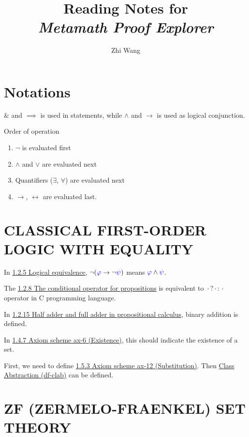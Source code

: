 \documentclass[12pt, letterpaper]{article}
\title{Reading Notes for \\ \large \textit{Metamath Proof Explorer}}
\author{Zhi Wang}
\newcommand{\blue}[1]{{\color{blue} #1}}
\newcommand{\ra}{\rightarrow}
\newcommand{\lra}{\leftrightarrow}
\newcommand{\wff}{\blue}
\newcommand*{\wc}{{}\cdot{}}    %
\theoremstyle{definition}
\theoremstyle{remark}
\theoremstyle{definition}
\theoremstyle{plain}
\begin{document}
	
	\maketitle
	
	\tableofcontents
	
	

	\section{Notations}
	$\&$ and $\implies$ is used in statements, while $\land$ and $\ra$ is used as logical conjunction.
	
	Order of operation
	\begin{enumerate}
		\item $\neg$ is evaluated first
		\item $\land$ and $\lor$ are evaluated next
		\item Quantifiers ($\exists$, $\forall$) are evaluated next
		\item $\ra$, $\lra$ are evaluated last.
	\end{enumerate}
	
	\section{CLASSICAL FIRST-ORDER LOGIC WITH EQUALITY}
	In \href{http://us.metamath.org/mpeuni/mmtheorems2.html#mm194s}{1.2.5  Logical equivalence},
	$\neg (\wff{\varphi} \ra \neg \wff{\psi})$ means $\wff{\varphi} \land \wff{\psi}$.
	
	The \href{http://us.metamath.org/mpeuni/mmtheorems11.html#mm1006s}
	{1.2.8  The conditional operator for propositions}
	is equivalent to $\wc ?\wc :\wc $ operator in C programming language.
	
	In \href{http://us.metamath.org/mpeuni/mmtheorems16.html#mm1523s}
	{1.2.15  Half adder and full adder in propositional calculus},
	binary addition is defined.
	
	In \href{http://us.metamath.org/mpeuni/mmtheorems19.html#mm1839s}
	{1.4.7  Axiom scheme ax-6 (Existence)},
	this should indicate the existence of a set.
	
	First, we need to define \href{http://us.metamath.org/mpeuni/mmtheorems20.html#mm1984s}
	{1.5.3  Axiom scheme ax-12 (Substitution)}.
	Then \href{http://us.metamath.org/mpeuni/df-clab.html}
	{Class Abstraction (df-clab)} can be defined.
	
	\section{ZF (ZERMELO-FRAENKEL) SET THEORY}
\end{document}
